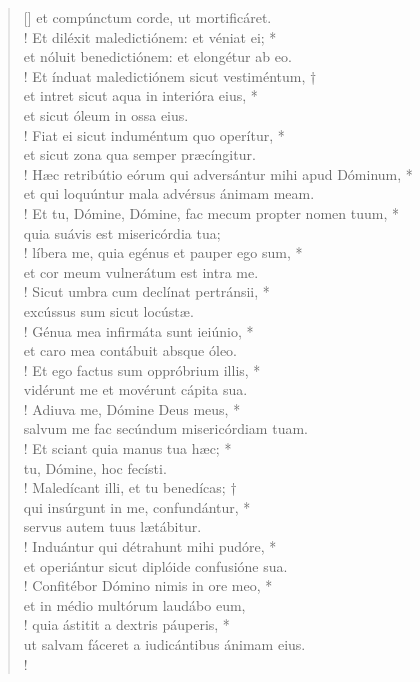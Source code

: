 \begin{verse}[\versewidth]
et compúnctum corde, ut mortificáret.\\!
\vin Et diléxit maledictiónem: et véniat ei; *\\
\vin et nóluit benedictiónem: et elongétur ab eo.\\!
Et índuat maledictiónem sicut vestiméntum, †\\
et intret sicut aqua in interióra eius, *\\
et sicut óleum in ossa eius.\\!
\vin Fiat ei sicut induméntum quo operítur, *\\
\vin et sicut zona qua semper præcíngitur.\\!
Hæc retribútio eórum qui adversántur mihi apud Dóminum, *\\
et qui loquúntur mala advérsus ánimam meam.\\!
\vin Et tu, Dómine, Dómine, fac mecum propter nomen tuum, *\\
\vin quia suávis est misericórdia tua;\\!
líbera me, quia egénus et pauper ego sum, *\\
et cor meum vulnerátum est intra me.\\!
\vin Sicut umbra cum declínat pertránsii, *\\
\vin excússus sum sicut locústæ.\\!
Génua mea infirmáta sunt ieiúnio, *\\
et caro mea contábuit absque óleo.\\!
\vin Et ego factus sum oppróbrium illis, *\\
\vin vidérunt me et movérunt cápita sua.\\!
Adiuva me, Dómine Deus meus, *\\
salvum me fac secúndum misericórdiam tuam.\\!
\vin Et sciant quia manus tua hæc; *\\
\vin tu, Dómine, hoc fecísti.\\!
Maledícant illi, et tu benedícas; †\\
qui insúrgunt in me, confundántur, *\\
servus autem tuus lætábitur.\\!
\vin Induántur qui détrahunt mihi pudóre, *\\
\vin et operiántur sicut diplóide confusióne sua.\\!
Confitébor Dómino nimis in ore meo, *\\
et in médio multórum laudábo eum,\\!
\vin quia ástitit a dextris páuperis, *\\
\vin ut salvam fáceret a iudicántibus ánimam eius.\\!
\end{verse}
\vspace{1cm}



